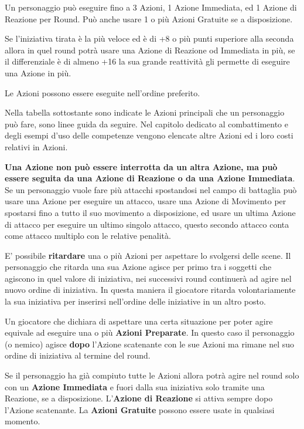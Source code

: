 \begin{multicols}{2}
Un personaggio può eseguire fino a 3 Azioni, 1 Azione Immediata, ed 1 Azione di Reazione per Round. Può anche usare 1 o più Azioni Gratuite se a disposizione.

Se l'iniziativa tirata è la più veloce ed è di +8 o più punti superiore alla seconda allora in quel round potrà usare una Azione di Reazione od Immediata in più, se il differenziale è di almeno +16 la sua grande reattività gli permette di eseguire una Azione in più.

Le Azioni possono essere eseguite nell'ordine preferito.

Nella tabella sottostante sono indicate le Azioni principali che un personaggio può fare, sono linee guida da seguire. Nel capitolo dedicato al combattimento e degli esempi d'uso delle competenze vengono elencate altre Azioni ed i loro costi relativi in Azioni.

\textbf{Una Azione non può essere interrotta da un altra Azione, ma può essere seguita da una Azione di Reazione o da una Azione Immediata}. 
Se un personaggio vuole fare più attacchi spostandosi nel campo di battaglia può usare una Azione per eseguire un attacco, usare una Azione di Movimento per spostarsi fino a tutto il suo movimento a disposizione, ed usare un ultima Azione di attacco per eseguire un ultimo singolo attacco, questo secondo attacco conta come attacco multiplo con le relative penalità.

E' possibile \textbf{ritardare} una o più Azioni per aspettare lo svolgersi delle scene. Il personaggio che ritarda una sua Azione agisce per primo tra i soggetti che agiscono in quel valore di iniziativa, nei successivi round continuerà ad agire nel nuovo ordine di iniziativa. In questa maniera il giocatore ritarda volontariamente la sua iniziativa per inserirsi nell'ordine delle iniziative in un altro posto.

Un giocatore che dichiara di aspettare una certa situazione per poter agire equivale ad eseguire una o più \textbf{Azioni Preparate}. In questo caso il personaggio (o nemico) agisce \textbf{dopo} l'Azione scatenante con le sue Azioni ma rimane nel suo ordine di iniziativa al termine del round.

Se il personaggio ha già compiuto tutte le Azioni allora potrà agire nel round solo con un \textbf{Azione Immediata} e fuori dalla sua iniziativa solo tramite una Reazione, se a disposizione. L'\textbf{Azione di Reazione} si attiva sempre dopo l'Azione scatenante.
La \textbf{Azioni Gratuite} possono essere usate in qualsiasi momento.


\end{multicols}
